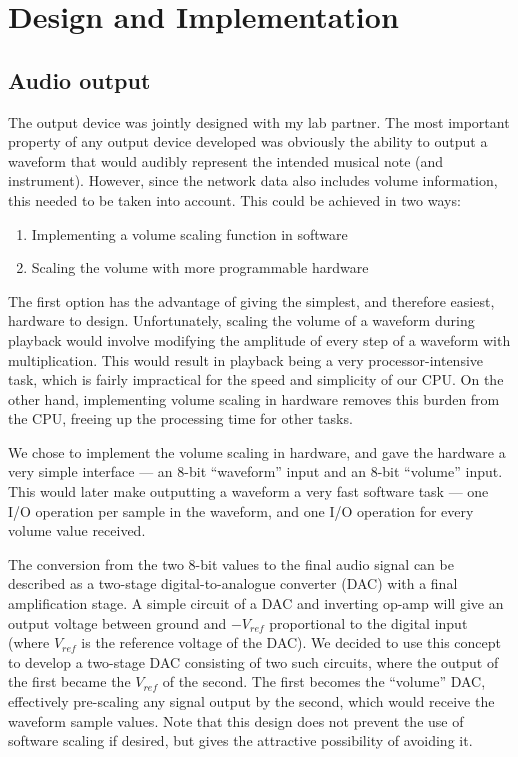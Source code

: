 \section{Design and Implementation}

\subsection{Audio output}
\label{sec:design:audio_output}

The output device was jointly designed with my lab partner.  The most important property of any 
output device developed was obviously the ability to output a waveform that would audibly represent 
the intended musical note (and instrument).  However, since the network data also includes volume 
information, this needed to be taken into account.  This could be achieved in two ways:
\begin{enumerate}
\item Implementing a volume scaling function in software
\item Scaling the volume with more programmable hardware
\end{enumerate}
The first option has the advantage of giving the simplest, and therefore easiest, hardware to 
design.  Unfortunately, scaling the volume of a waveform during playback would involve modifying the 
amplitude of every step of a waveform with multiplication.  This would result in playback being a 
very processor-intensive task, which is fairly impractical for the speed and simplicity of our CPU.  
On the other hand, implementing volume scaling in hardware removes this burden from the CPU, freeing 
up the processing time for other tasks.

We chose to implement the volume scaling in hardware, and gave the hardware a very simple interface 
--- an 8-bit ``waveform'' input and an 8-bit ``volume'' input.  This would later make outputting a 
waveform a very fast software task --- one I/O operation per sample in the waveform, and one I/O 
operation for every volume value received.

The conversion from the two 8-bit values to the final audio signal can be described as a two-stage 
digital-to-analogue converter (DAC) with a final amplification stage.  A simple circuit of a DAC and 
inverting op-amp will give an output voltage between ground and $-V_{ref}$ proportional to the 
digital input (where $V_{ref}$ is the reference voltage of the DAC).  We decided to use this concept 
to develop a two-stage DAC consisting of two such circuits, where the output of the first became the 
$V_{ref}$ of the second.  The first becomes the ``volume'' DAC, effectively pre-scaling any signal 
output by the second, which would receive the waveform sample values.  Note that this design does 
not prevent the use of software scaling if desired, but gives the attractive possibility of avoiding 
it.

